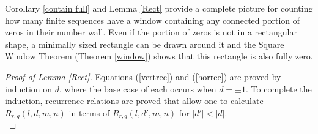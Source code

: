 \documentclass{article}
\theoremstyle{definition}
\numberwithin{equation}{subsection}
\begin{document}
\noindent Corollary \ref{contain full} and Lemma \ref{Rect} provide a complete picture for counting how many finite sequences have a window containing any connected portion of zeros in their number wall. Even if the portion of zeros is not in a rectangular shape, a minimally sized rectangle can be drawn around it and the Square Window Theorem (Theorem \ref{window}) shows that this rectangle is also fully zero. 
\begin{proof}[Proof of Lemma \ref{Rect}]
\noindent Equations (\ref{vertrec}) and (\ref{horrec}) are proved by induction on $d$, where the base case of each occurs when $d=\pm1$. To complete the induction, recurrence relations are proved that allow one to calculate $R_{r,q}(l,d,m,n)$ in terms of $R_{r,q}(l,d',m,n)$ for $|d'|<|d|$. \\


\end{proof}
\end{document}
